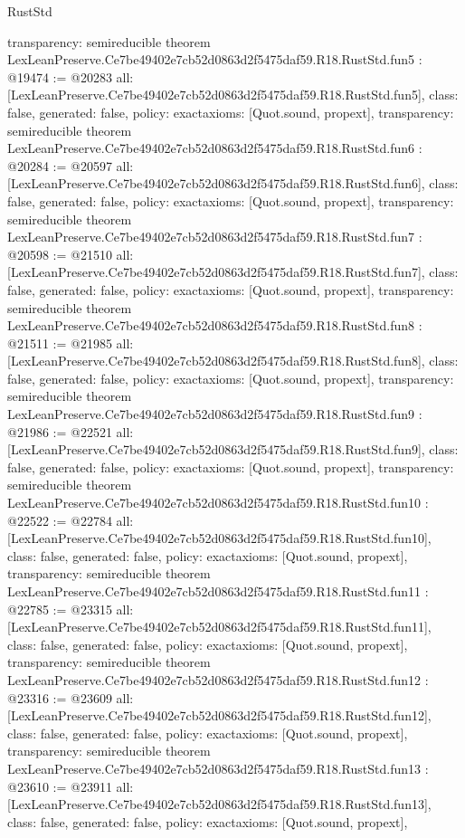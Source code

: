 \begin{lexlean}{RustStd}
\begin{coremodule}
{  transparency: semireducible
}
theorem LexLeanPreserve.Ce7be49402e7cb52d0863d2f5475daf59.R18.RustStd.fun5 : @19474 := @20283 {
  all: [LexLeanPreserve.Ce7be49402e7cb52d0863d2f5475daf59.R18.RustStd.fun5],
  class: false,
  generated: false,
  policy: exact{axioms: [Quot.sound, propext]},
  transparency: semireducible
}
theorem LexLeanPreserve.Ce7be49402e7cb52d0863d2f5475daf59.R18.RustStd.fun6 : @20284 := @20597 {
  all: [LexLeanPreserve.Ce7be49402e7cb52d0863d2f5475daf59.R18.RustStd.fun6],
  class: false,
  generated: false,
  policy: exact{axioms: [Quot.sound, propext]},
  transparency: semireducible
}
theorem LexLeanPreserve.Ce7be49402e7cb52d0863d2f5475daf59.R18.RustStd.fun7 : @20598 := @21510 {
  all: [LexLeanPreserve.Ce7be49402e7cb52d0863d2f5475daf59.R18.RustStd.fun7],
  class: false,
  generated: false,
  policy: exact{axioms: [Quot.sound, propext]},
  transparency: semireducible
}
theorem LexLeanPreserve.Ce7be49402e7cb52d0863d2f5475daf59.R18.RustStd.fun8 : @21511 := @21985 {
  all: [LexLeanPreserve.Ce7be49402e7cb52d0863d2f5475daf59.R18.RustStd.fun8],
  class: false,
  generated: false,
  policy: exact{axioms: [Quot.sound, propext]},
  transparency: semireducible
}
theorem LexLeanPreserve.Ce7be49402e7cb52d0863d2f5475daf59.R18.RustStd.fun9 : @21986 := @22521 {
  all: [LexLeanPreserve.Ce7be49402e7cb52d0863d2f5475daf59.R18.RustStd.fun9],
  class: false,
  generated: false,
  policy: exact{axioms: [Quot.sound, propext]},
  transparency: semireducible
}
theorem LexLeanPreserve.Ce7be49402e7cb52d0863d2f5475daf59.R18.RustStd.fun10 : @22522 := @22784 {
  all: [LexLeanPreserve.Ce7be49402e7cb52d0863d2f5475daf59.R18.RustStd.fun10],
  class: false,
  generated: false,
  policy: exact{axioms: [Quot.sound, propext]},
  transparency: semireducible
}
theorem LexLeanPreserve.Ce7be49402e7cb52d0863d2f5475daf59.R18.RustStd.fun11 : @22785 := @23315 {
  all: [LexLeanPreserve.Ce7be49402e7cb52d0863d2f5475daf59.R18.RustStd.fun11],
  class: false,
  generated: false,
  policy: exact{axioms: [Quot.sound, propext]},
  transparency: semireducible
}
theorem LexLeanPreserve.Ce7be49402e7cb52d0863d2f5475daf59.R18.RustStd.fun12 : @23316 := @23609 {
  all: [LexLeanPreserve.Ce7be49402e7cb52d0863d2f5475daf59.R18.RustStd.fun12],
  class: false,
  generated: false,
  policy: exact{axioms: [Quot.sound, propext]},
  transparency: semireducible
}
theorem LexLeanPreserve.Ce7be49402e7cb52d0863d2f5475daf59.R18.RustStd.fun13 : @23610 := @23911 {
  all: [LexLeanPreserve.Ce7be49402e7cb52d0863d2f5475daf59.R18.RustStd.fun13],
  class: false,
  generated: false,
  policy: exact{axioms: [Quot.sound, propext]},
}
\end{coremodule}
\end{lexlean}
